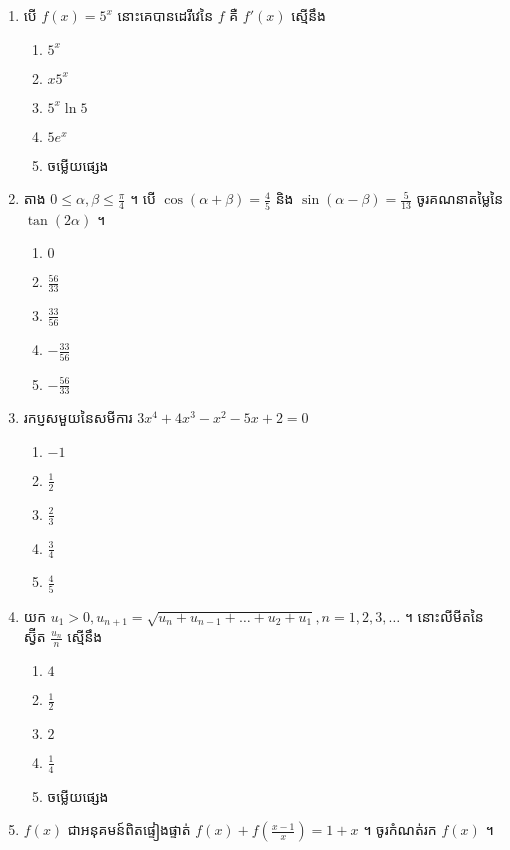 \documentclass[12pt, a4paper]{article}
\begin{document}
\begin{enumerate}[m]
	\item បើ $f(x)=5^x$ នោះគេបានដេរីវេនៃ $f$ គឺ $f'(x)$ ស្មើនឹង
	\begin{enumerate}[k,5]
		\item $5^x$
		\item $x5^x$
		\item $5^x\ln5$
		\item $5e^x$
		\item ចម្លើយផ្សេង
	\end{enumerate}
	{\color{blue}\hrulefill}
	\item តាង $0\leq\alpha,\beta\leq\frac{\pi}{4}$ ។ បើ $\cos\left(\alpha+\beta\right)=\frac{4}{5}$ និង $\sin\left(\alpha-\beta\right)=\frac{5}{13}$ ចូរគណនាតម្លៃនៃ $\tan\left(2\alpha\right)$ ។
	\begin{enumerate}[k,5]
		\item $0$
		\item $\frac{56}{33}$
		\item $\frac{33}{56}$
		\item $-\frac{33}{56}$
		\item $-\frac{56}{33}$
	\end{enumerate}
	{\color{blue}\hrulefill}
	\item រកប្ញសមួយនៃសមីការ $3x^4+4x^3-x^2-5x+2=0$
	\begin{enumerate}[k,5]
		\item $-1$
		\item $\frac{1}{2}$
		\item $\frac{2}{3}$
		\item $\frac{3}{4}$
		\item $\frac{4}{5}$
	\end{enumerate}
	{\color{blue}\hrulefill}
	\item យក $u_1>0, u_{n+1}=\sqrt{u_n+u_{n-1}+\dots+u_2+u_1},n=1,2,3,\dots$ ។ នោះលីមីតនៃស្វ៊ីត $\frac{u_n}{n}$ ស្មើនឹង
	\begin{enumerate}[k,5]
		\item $4$
		\item $\frac{1}{2}$
		\item $2$
		\item $\frac{1}{4}$
		\item ចម្លើយផ្សេង
	\end{enumerate}
		{\color{blue}\hrulefill}
	\item $f(x)$ ជាអនុគមន៍ពិតផ្ទៀងផ្ទាត់ $f(x)+f\left(\frac{x-1}{x}\right)=1+x$ ។ ចូរកំណត់រក $f(x)$ ។
	\begin{enumerate}[k,3]

\end{enumerate}
\end{enumerate}
\end{document}
